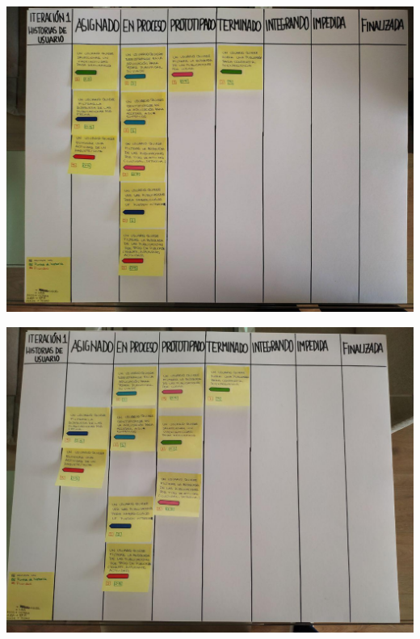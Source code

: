 \documentclass[spanish]{beamer}
\begin{document}
\begin{frame}
	\begin{center}
		\includegraphics[angle=90, scale=0.335]{papel1_5}
	\end{center}
\end{frame}

\begin{frame}
	\begin{center}
		\includegraphics[angle=0, scale=0.34]{papel1_6}
	\end{center}
\end{frame}
\end{document}
